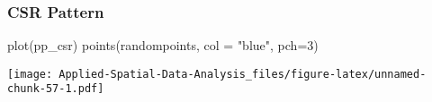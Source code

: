 \documentclass[
]{book}
\newenvironment{Shaded}{\begin{snugshade}}{\end{snugshade}}
\newcommand{\AttributeTok}[1]{\textcolor[rgb]{0.77,0.63,0.00}{#1}}
\newcommand{\DecValTok}[1]{\textcolor[rgb]{0.00,0.00,0.81}{#1}}
\newcommand{\FunctionTok}[1]{\textcolor[rgb]{0.00,0.00,0.00}{#1}}
\newcommand{\NormalTok}[1]{#1}
\newcommand{\StringTok}[1]{\textcolor[rgb]{0.31,0.60,0.02}{#1}}
\begin{document}
\hypertarget{csr-pattern-1}{%
\subsubsection{CSR Pattern}\label{csr-pattern-1}}

\begin{Shaded}
\begin{Highlighting}[]
\FunctionTok{plot}\NormalTok{(pp\_csr)}
\FunctionTok{points}\NormalTok{(randompoints, }\AttributeTok{col =} \StringTok{"blue"}\NormalTok{, }\AttributeTok{pch=}\DecValTok{3}\NormalTok{)}
\end{Highlighting}
\end{Shaded}

\texttt{[image: Applied-Spatial-Data-Analysis\_files/figure-latex/unnamed-chunk-57-1.pdf]}
\end{document}
